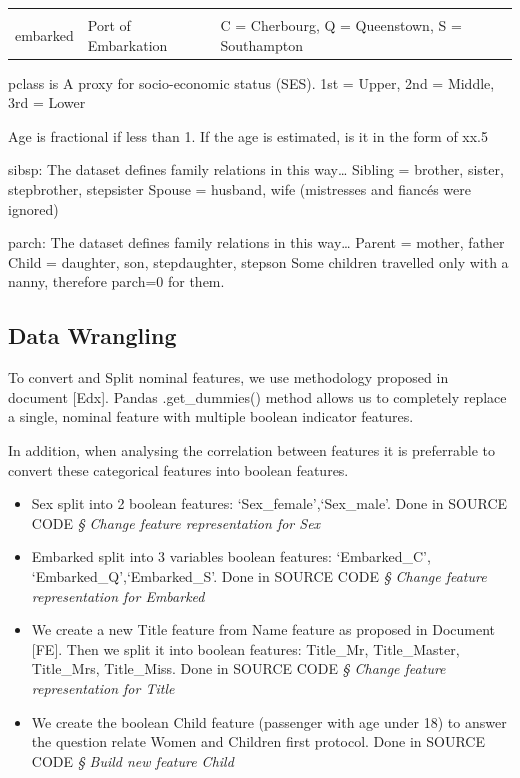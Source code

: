 \documentclass[11pt]{article}
\begin{document}
\begin{longtable}[]{@{}lll@{}}
\begin{minipage}[t]{0.18\columnwidth}
\strut
\end{minipage}\tabularnewline
\begin{minipage}[t]{0.18\columnwidth}\raggedright\strut
embarked\strut
\end{minipage} & \begin{minipage}[t]{0.18\columnwidth}\raggedright\strut
Port of Embarkation\strut
\end{minipage} & \begin{minipage}[t]{0.18\columnwidth}\raggedright\strut
C = Cherbourg, Q = Queenstown, S = Southampton\strut
\end{minipage}\tabularnewline
\bottomrule
\end{longtable}

pclass is A proxy for socio-economic status (SES). 1st = Upper, 2nd =
Middle, 3rd = Lower

Age is fractional if less than 1. If the age is estimated, is it in the
form of xx.5

sibsp: The dataset defines family relations in this way\ldots{} Sibling
= brother, sister, stepbrother, stepsister Spouse = husband, wife
(mistresses and fiancés were ignored)

parch: The dataset defines family relations in this way\ldots{} Parent =
mother, father Child = daughter, son, stepdaughter, stepson Some
children travelled only with a nanny, therefore parch=0 for them.

    \subsection{Data Wrangling}\label{data-wrangling}

To convert and Split nominal features, we use methodology proposed in
document {[}Edx{]}. Pandas .get\_dummies() method allows us to
completely replace a single, nominal feature with multiple boolean
indicator features.

In addition, when analysing the correlation between features it is
preferrable to convert these categorical features into boolean features.

\begin{itemize}
\item
  Sex split into 2 boolean features: `Sex\_female',`Sex\_male'. Done in
  SOURCE CODE \emph{§ Change feature representation for Sex}
\item
  Embarked split into 3 variables boolean features: `Embarked\_C',
  `Embarked\_Q',`Embarked\_S'. Done in SOURCE CODE \emph{§ Change
  feature representation for Embarked}
\item
  We create a new Title feature from Name feature as proposed in
  Document {[}FE{]}. Then we split it into boolean features: Title\_Mr,
  Title\_Master, Title\_Mrs, Title\_Miss. Done in SOURCE CODE \emph{§
  Change feature representation for Title}
\item
  We create the boolean Child feature (passenger with age under 18) to
  answer the question relate Women and Children first protocol. Done in
  SOURCE CODE \emph{§ Build new feature Child}
\end{itemize}
\end{document}
